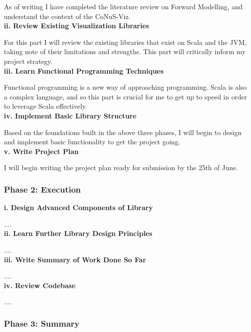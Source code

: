 \documentclass[12pt]{article}
\begin{document}
As of writing I have completed the literature review on Forward Modelling, and understand the context of the CoNuS-Viz. \\

\textbf{ii. Review Existing Visualization Libraries}

For this part I will review the existing libraries that exist on Scala and the JVM, taking note of their limitations and strengths. This part will critically inform my project strategy. \\

\textbf{iii. Learn Functional Programming Techniques}

Functional programming is a new way of approaching programming. Scala is also a complex language, and so this part is crucial for me to get up to speed in order to leverage Scala effectively. \\


\textbf{iv. Implement Basic Library Structure}

Based on the foundations built in the above three phases, I will begin to design and implement basic functionality to get the project going. \\

\textbf{v. Write Project Plan}

I will begin writing the project plan ready for submission by the 25th of June. \\


\subsubsection{Phase 2: Execution}

\textbf{i. Design Advanced Components of Library}

.... \\

\textbf{ii. Learn Further Library Design Principles}

.... \\

\textbf{iii. Write Summary of Work Done So Far}

.... \\

\textbf{iv. Review Codebase}

.... \\

\subsubsection{Phase 3: Summary}
\end{document}
